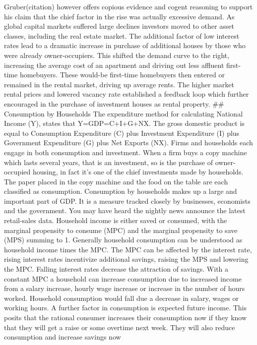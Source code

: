 \documentclass[12pt,a4paper,]{article}
\begin{document}
Gruber(citation) however offers copious evidence and cogent reasoning to
support his claim that the chief factor in the rise was actually
excessive demand. As global capital markets suffered large declines
investors moved to other asset classes, including the real estate
market. The additional factor of low interest rates lead to a dramatic
increase in purchase of additional houses by those who were already
owner-occupiers. This shifted the demand curve to the right, increasing
the average cost of an apartment and driving out less affluent
first-time homebuyers. These would-be first-time homebuyers then entered
or remained in the rental market, driving up average rents. The higher
market rental prices and lowered vacancy rate established a feedback
loop which further encouraged in the purchase of investment houses as
rental property. \#\# Consumption by Households The expenditure method
for calculating National Income (Y), states that Y=GDP=C+I+G+NX. The
gross domestic product is equal to Consumption Expenditure (C) plus
Investment Expenditure (I) plus Government Expenditure (G) plus Net
Exports (NX). Firms and households each engage in both consumption and
investment. When a firm buys a copy machine which lasts several years,
that is an investment, so is the purchase of owner-occupied housing, in
fact it's one of the chief investments made by households. The paper
placed in the copy machine and the food on the table are each classified
as consumption. Consumption by households makes up a large and important
part of GDP. It is a measure tracked closely by businesses, economists
and the government. You may have heard the nightly news announce the
latest retail-sales data. Household income is either saved or consumed,
with the marginal propensity to consume (MPC) and the marginal
propensity to save (MPS) summing to 1. Generally household consumption
can be understood as household income times the MPC. The MPC can be
affected by the interest rate, rising interest rates incentivize
additional savings, raising the MPS and lowering the MPC. Falling
interest rates decrease the attraction of savings. With a constant MPC a
household can increase consumption due to increased income from a salary
increase, hourly wage increase or increase in the number of hours
worked. Household consumption would fall due a decrease in salary, wages
or working hours. A further factor in consumption is expected future
income. This posits that the rational consumer increases their
consumption now if they know that they will get a raise or some overtime
next week. They will also reduce consumption and increase savings now
\end{document}
